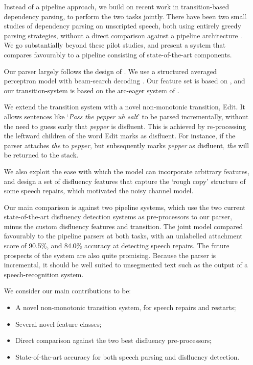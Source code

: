 \documentclass[11pt,letterpaper]{article}
\begin{document}
Instead of a pipeline approach, we build on recent work in transition-based dependency
parsing, to perform the two tasks jointly.
There have been two small studies of dependency parsing on unscripted speech,
both using entirely greedy parsing strategies, without a direct comparison
against a pipeline architecture \citep{jorgensen:07,rasooli:13}.  We go substantially
beyond these pilot studies, and present a system that compares favourably to a
pipeline consisting of state-of-the-art components.

Our parser largely follows the design of \citet{zhang:cl11}. We use a structured averaged
perceptron model with beam-search decoding \citep{collins:02}. Our feature set
is based on \citet{zhang:cl11}, and our transition-system is based on the arc-eager
system of \citet{nivre:03}.

We extend the transition system with a novel non-monotonic transition, Edit.
It allows sentences like `\emph{Pass the pepper uh salt}'
to be parsed incrementally, without the need to guess early that \emph{pepper}
is disfluent.  This is achieved by re-processing the leftward children of
the word Edit marks as disfluent.  For instance, if the parser attaches \emph{the}
to \emph{pepper}, but subsequently marks \emph{pepper} as disfluent, \emph{the} will
be returned to the stack.

We also exploit the ease with which the model can incorporate arbitrary
features, and design a set of disfluency features that capture the
`rough copy' structure of some speech repairs, which motivated the
\citet{Johnson04a} noisy channel model.

Our main comparison is against two pipeline systems, which use the two current 
state-of-the-art disfluency detection systems as pre-processors to our
parser, minus the custom disfluency features and transition.
The joint model compared favourably to the pipeline parsers at both tasks, with
an unlabelled attachment score of 90.5\%, and 84.0\% accuracy at detecting speech
repairs.
The future prospects of the system are also quite promising.
Because the parser is incremental, it should be well suited to
unsegmented text such as the output of a speech-recognition system.

We consider our main contributions to be:

\begin{itemize}
    \itemsep0em
    \item A novel non-monotonic transition system, for speech repairs and restarts;
    \item Several novel feature classes;
    \item Direct comparison against the two best disfluency pre-processors;
    \item State-of-the-art accuracy for both speech parsing and disfluency detection.
\end{itemize}
\end{document}
